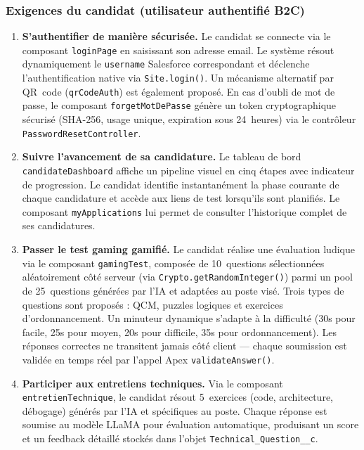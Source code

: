 \subsubsection{Exigences du candidat (utilisateur authentifié B2C)}

\begin{enumerate}[label=\textbf{EF-C\arabic*}]
    \item \textbf{S'authentifier de manière sécurisée.} Le candidat se connecte via le composant \texttt{loginPage} en saisissant son adresse email. Le système résout dynamiquement le \texttt{username} Salesforce correspondant et déclenche l'authentification native via \texttt{Site.login()}. Un mécanisme alternatif par QR~code (\texttt{qrCodeAuth}) est également proposé. En cas d'oubli de mot de passe, le composant \texttt{forgetMotDePasse} génère un token cryptographique sécurisé (SHA-256, usage unique, expiration sous 24~heures) via le contrôleur \texttt{PasswordResetController}.
    
    \item \textbf{Suivre l'avancement de sa candidature.} Le tableau de bord \texttt{candidateDashboard} affiche un pipeline visuel en cinq étapes avec indicateur de progression. Le candidat identifie instantanément la phase courante de chaque candidature et accède aux liens de test lorsqu'ils sont planifiés. Le composant \texttt{myApplications} lui permet de consulter l'historique complet de ses candidatures.
    
    \item \textbf{Passer le test gaming gamifié.} Le candidat réalise une évaluation ludique via le composant \texttt{gamingTest}, composée de 10~questions sélectionnées aléatoirement côté serveur (via \texttt{Crypto.getRandomInteger()}) parmi un pool de 25~questions générées par l'IA et adaptées au poste visé. Trois types de questions sont proposés : QCM, puzzles logiques et exercices d'ordonnancement. Un minuteur dynamique s'adapte à la difficulté (30s pour facile, 25s pour moyen, 20s pour difficile, 35s pour ordonnancement). Les réponses correctes ne transitent jamais côté client --- chaque soumission est validée en temps réel par l'appel Apex \texttt{validateAnswer()}.
    
    \item \textbf{Participer aux entretiens techniques.} Via le composant \texttt{entretienTechnique}, le candidat résout 5~exercices (code, architecture, débogage) générés par l'IA et spécifiques au poste. Chaque réponse est soumise au modèle LLaMA pour évaluation automatique, produisant un score et un feedback détaillé stockés dans l'objet \texttt{Technical\_Question\_\_c}.
    

\end{enumerate}

